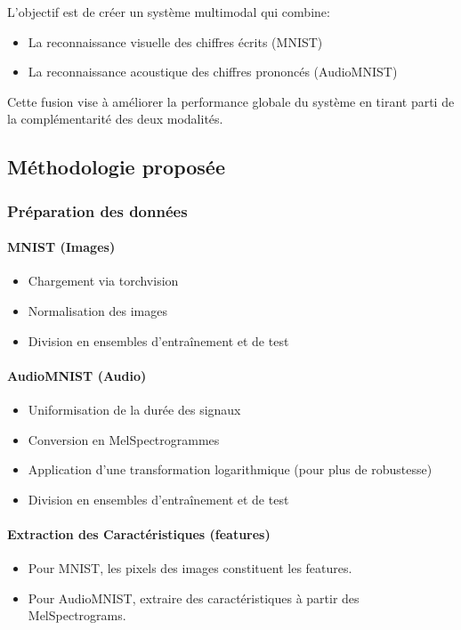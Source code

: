 \documentclass[11pt,a4paper]{article}
\begin{document}
L'objectif est de créer un système multimodal qui combine:
\begin{itemize}
    \item La reconnaissance visuelle des chiffres écrits (MNIST)
    \item La reconnaissance acoustique des chiffres prononcés (AudioMNIST)
\end{itemize}

Cette fusion vise à améliorer la performance globale du système en tirant parti de la complémentarité des deux modalités.

\subsection{Méthodologie proposée}
\label{subsec:methodologie}

\subsubsection{Préparation des données}
\label{subsubsec:prep_multi}

\paragraph{MNIST (Images)}
\begin{itemize}
    \item Chargement via torchvision
    \item Normalisation des images
    \item Division en ensembles d'entraînement et de test
\end{itemize}

\paragraph{AudioMNIST (Audio)}
\begin{itemize}
    \item Uniformisation de la durée des signaux
    \item Conversion en MelSpectrogrammes
    \item Application d'une transformation logarithmique (pour plus de robustesse)
    \item Division en ensembles d'entraînement et de test
\end{itemize}

\paragraph{Extraction des Caractéristiques (features)}
\begin{itemize}
    \item Pour MNIST, les pixels des images constituent les features.
    \item Pour AudioMNIST, extraire des caractéristiques à partir des MelSpectrograms.
\end{itemize}
\end{document}
